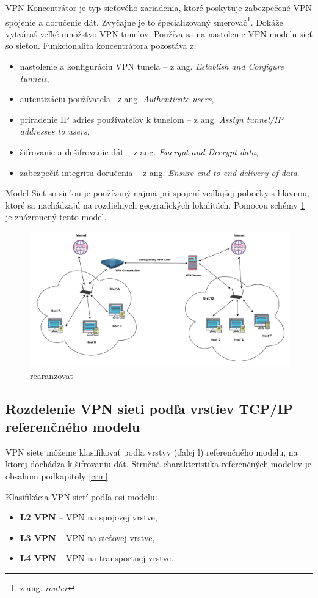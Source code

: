 VPN Koncentrátor je typ sieťového zariadenia, ktoré poskytuje zabezpečené VPN spojenie a doručenie dát. Zvyčajne je to špecializovaný smerovač\footnote{z ang. \textit{router}}. Dokáže vytvárať veľké množstvo VPN tunelov. Používa sa na nastolenie VPN modelu sieť so sieťou. Funkcionalita koncentrátora pozostáva z: 
\begin{itemize}
	\item{nastolenie a konfiguráciu VPN tunela} -- z ang. \textit{Establish and Configure tunnels},
	\item{autentizáciu používateľa}-- z ang. \textit{Authenticate users},
	\item{priradenie IP adries používateľov k tunelom} -- z ang. \textit{Assign tunnel/IP addresses to users},
	\item{šifrovanie a dešifrovanie dát} -- z ang. \textit{Encrypt and Decrypt data},
	\item{zabezpečiť integritu doručenia} -- z ang. \textit{Ensure end-to-end delivery of data}.
\end{itemize}

Model Sieť so sieťou je používaný najmä pri spojení vedľajšej pobočky s hlavnou, ktoré sa nachádzajú na rozdielnych geografických lokalitách. Pomocou schémy \ref{sts} je znázronený tento model. 

 \begin{figure}[!ht]
 	\centering
 	\includegraphics[width=.7\textwidth]{figures/sts}
 	\caption{rearanzovat}
 	\label{sts}
 \end{figure}    
\subsection{Rozdelenie VPN sieti podľa vrstiev TCP/IP referenčného modelu}\label{rm}
VPN siete môžeme klasifikovať podľa vrstvy (ďalej \acrshort{l}) referenčného modelu, na ktorej dochádza k šifrovaniu dát. Stručná charakteristika referenčných modelov je obsahom podkapitoly \ref{crm}.

Klasifikácia VPN sietí podľa \acrshort{osi} modelu:
\begin{itemize}
	\item{\textbf{L2 VPN}} -- VPN na spojovej vrstve,
	\item{\textbf{L3 VPN}} -- VPN na sieťovej vrstve,
	\item{\textbf{L4 VPN}} -- VPN na transportnej vrstve.
\end{itemize}



